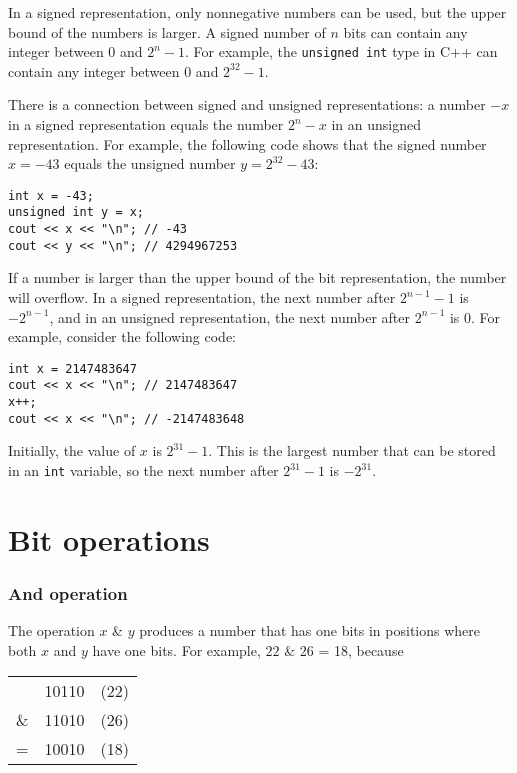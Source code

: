 In a signed representation, only nonnegative
numbers can be used, but the upper bound of the numbers is larger.
A signed number of $n$ bits can contain any
integer between $0$ and $2^n-1$.
For example, the \texttt{unsigned int} type in C++
can contain any integer between $0$ and $2^{32}-1$.

There is a connection between signed and unsigned
representations:
a number $-x$ in a signed representation
equals the number $2^n-x$ in an unsigned representation.
For example, the following code shows that
the signed number $x=-43$ equals the unsigned
number $y=2^{32}-43$:
\begin{lstlisting}
int x = -43;
unsigned int y = x;
cout << x << "\n"; // -43
cout << y << "\n"; // 4294967253
\end{lstlisting}

If a number is larger than the upper bound
of the bit representation, the number will overflow.
In a signed representation,
the next number after $2^{n-1}-1$ is $-2^{n-1}$,
and in an unsigned representation,
the next number after $2^{n-1}$ is $0$.
For example, consider the following code:
\begin{lstlisting}
int x = 2147483647
cout << x << "\n"; // 2147483647
x++;
cout << x << "\n"; // -2147483648
\end{lstlisting}

Initially, the value of $x$ is $2^{31}-1$.
This is the largest number that can be stored
in an \texttt{int} variable,
so the next number after $2^{31}-1$ is $-2^{31}$.


\section{Bit operations}

\newcommand\XOR{\mathbin{\char`\^}}

\subsubsection{And operation}


The  operation $x$ \& $y$ produces a number
that has one bits in positions where both
$x$ and $y$ have one bits.
For example, $22$ \& $26$ = 18, because

\begin{center}
\begin{tabular}{rrr}
& 10110 & (22)\\
\& & 11010 & (26) \\
\hline
 = & 10010 & (18) \\
\end{tabular}
\end{center}

